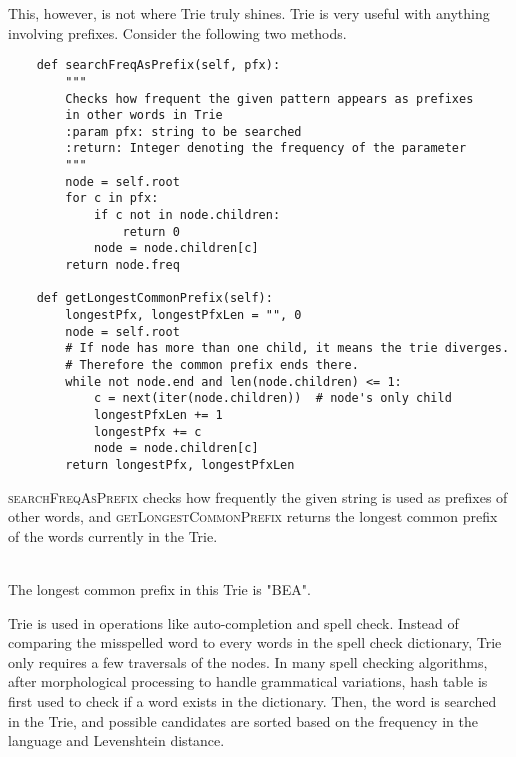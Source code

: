 \noindent This, however, is not where Trie truly shines.
Trie is very useful with anything involving prefixes.
Consider the following two methods.

\begin{verbatim}
    def searchFreqAsPrefix(self, pfx):
        """
        Checks how frequent the given pattern appears as prefixes
        in other words in Trie
        :param pfx: string to be searched
        :return: Integer denoting the frequency of the parameter
        """
        node = self.root
        for c in pfx:
            if c not in node.children:
                return 0
            node = node.children[c]
        return node.freq

    def getLongestCommonPrefix(self):
        longestPfx, longestPfxLen = "", 0
        node = self.root
        # If node has more than one child, it means the trie diverges.
        # Therefore the common prefix ends there.
        while not node.end and len(node.children) <= 1:
            c = next(iter(node.children))  # node's only child
            longestPfxLen += 1
            longestPfx += c
            node = node.children[c]
        return longestPfx, longestPfxLen
\end{verbatim}

\noindent \textsc{searchFreqAsPrefix} checks how frequently the given string is used as prefixes of other words, and \textsc{getLongestCommonPrefix} returns the longest common prefix of the words currently in the Trie.

\begin{center}
  \\
  The longest common prefix in this Trie is "BEA".
\end{center}

Trie is used in operations like auto-completion and spell check.
Instead of comparing the misspelled word to every words in the spell check dictionary, Trie only requires a few traversals of the nodes.
In many spell checking algorithms, after morphological processing to handle grammatical variations, hash table is first used to check if a word exists in the dictionary.
Then, the word is searched in the Trie, and possible candidates are sorted based on the frequency in the language and Levenshtein distance.

